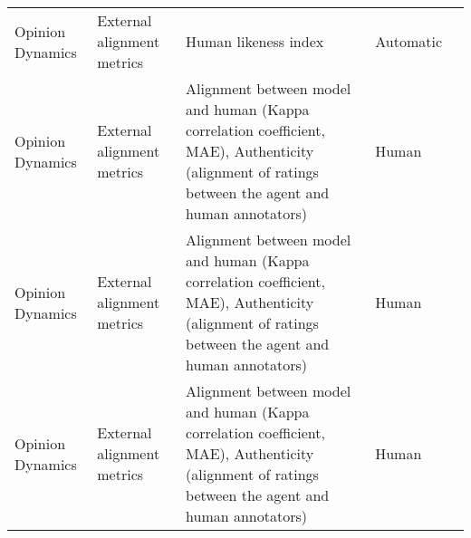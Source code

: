 \begin{small}
\begin{center}
\begin{longtable}{@{}p{}p{}p{}p{}p{}@{}}
Opinion Dynamics         & External alignment metrics          & Human likeness index                                                                                                                                                                                        & Automatic & \cite{Chuang2023TheWO}                                                                                                                                                                                                                                                                                                                                                                                        \\
Opinion Dynamics         & External alignment metrics          & Alignment between model and human (Kappa correlation coefficient, MAE), Authenticity (alignment of ratings between the agent and human annotators)                                                          & Human     & \cite{Chan2023ChatEvalTB}                                                                                                                                                                                                                                                                                                                                                                                                  \\
Opinion Dynamics         & External alignment metrics          & Alignment between model and human (Kappa correlation coefficient, MAE), Authenticity (alignment of ratings between the agent and human annotators)                                                          & Human     & \cite{triem2024tipping}                                                                                                                                                                                                                                                                                                                                                                  \\
Opinion Dynamics         & External alignment metrics          & Alignment between model and human (Kappa correlation coefficient, MAE), Authenticity (alignment of ratings between the agent and human annotators)                                                          & Human     & \cite{lv2024coggpt}                                                                                                                                                                                                                                                                                                                                                                                              \\

\end{longtable}
\end{center}
\end{small}
